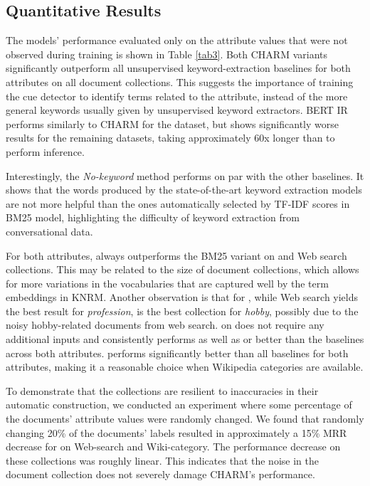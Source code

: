 \setlength\dashlinedash{0.2pt}
\setlength\dashlinegap{1.5pt}
\setlength\arrayrulewidth{0.3pt}




\subsection{Quantitative Results}

The models' performance evaluated only on the attribute values that were not observed during training is shown in Table \ref{tab3}.
Both CHARM variants significantly outperform all unsupervised keyword-extraction baselines for both attributes on all document collections. This suggests the importance of training the cue detector to identify terms related to the attribute, instead of the more general keywords usually given by unsupervised keyword extractors.
BERT IR performs similarly to CHARM for the  dataset, but shows significantly worse results for the remaining datasets, taking approximately 60x longer than  to perform inference.

Interestingly, the \emph{No-keyword} method performs on par with the other baselines. It shows that the words produced by the state-of-the-art keyword extraction models are not more helpful than the ones automatically selected by TF-IDF scores in BM25 model, highlighting the difficulty of keyword extraction from conversational data.

For both attributes,  always outperforms the BM25 variant on  and Web search collections. This may be related to the size of document collections, which allows for more variations in the vocabularies that are captured well by the term embeddings in KNRM. Another observation is that for , while Web search yields the best result for \emph{profession},  is the best collection for \emph{hobby}, possibly due to the noisy hobby-related documents from web search.
 on  does not require any additional inputs and consistently performs as well as or better than the baselines across both attributes. 
 performs significantly better than all baselines for both attributes, making it a reasonable choice when Wikipedia categories are available.

To demonstrate that the collections are resilient to inaccuracies in their automatic construction, we conducted an experiment where some percentage of the documents' attribute values were randomly changed. We found that randomly changing 20\% of the documents' labels resulted in approximately a 15\% MRR decrease for  on Web-search and Wiki-category.
The performance decrease on these collections was roughly linear.
This indicates that the noise in the document collection does not severely damage CHARM's performance.

